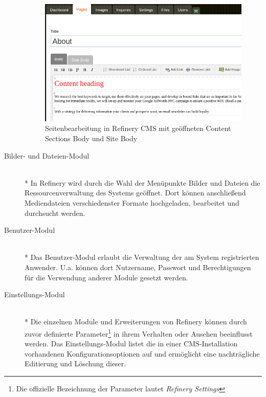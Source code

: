 \begin{description}
\begin{figure}[!h]
\begin{center}
\includegraphics[scale=0.6]{images/analyse/refinery/contentsections.png}
\caption{Seitenbearbeitung in Refinery CMS mit geöffneten Content Sections Body und Site Body}
\label{contentsections}
\end{center}
\end{figure}
\item[Bilder- und Dateien-Modul]\mbox{~}\\*
In Refinery wird durch die Wahl der Menüpunkte Bilder und Dateien die Ressourcenverwaltung des Systems geöffnet. Dort können anschließend Mediendateien verschiedenster Formate hochgeladen, bearbeitet und durchsucht werden.
\item[Benutzer-Modul]\mbox{~}\\*
Das Benutzer-Modul erlaubt die Verwaltung der am System registrierten Anwender. U.a. können dort Nutzername, Passwort und Berechtigungen für die Verwendung anderer Module gesetzt werden.
\item[Einstellungs-Modul]\mbox{~}\\*
Die einzelnen Module und Erweiterungen von Refinery können durch zuvor definierte Parameter\footnote{Die offizielle Bezeichnung der Parameter lautet \emph{Refinery Settings}} in ihrem Verhalten oder Ausehen beeinflusst werden. Das Einstellungs-Modul listet die in einer CMS-Installation vorhandenen Konfigurationsoptionen auf und ermöglicht eine nachträgliche Editierung und Löschung dieser.
\end{description}

